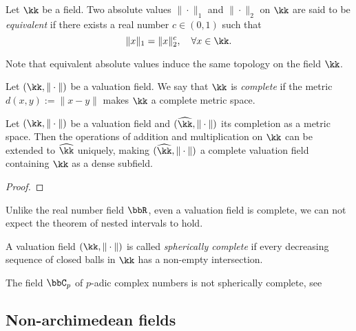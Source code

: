    \begin{definition}\label{def:equivalent_of_absolute_values}
        Let \(\kk\) be a field.
        Two absolute values \(\|\cdot\|_1\) and \(\|\cdot\|_2\) on \(\kk\) are said to be \emph{equivalent} if there exists a real number \(c \in (0,1)\) such that
        \[ \|x\|_1 = \|x\|_2^c, \quad \forall x \in \kk. \]
    \end{definition}

    Note that equivalent absolute values induce the same topology on the field \(\kk\).

    \begin{definition}\label{def:complete_valuation_field}
        Let \((\kk,\|\cdot\|)\) be a valuation field.
        We say that \(\kk\) is \emph{complete} if the metric \(d(x,y) := \|x - y\|\) makes \(\kk\) a complete metric space.
    \end{definition}

    \begin{lemma}\label{lem:completion_of_valuation_field}
        Let \((\kk,\|\cdot\|)\) be a valuation field and \((\widehat{\kk},\|\cdot\|)\) its completion as a metric space.
        Then the operations of addition and multiplication on \(\kk\) can be extended to \(\widehat{\kk}\) uniquely, making \((\widehat{\kk},\|\cdot\|)\) a complete valuation field containing \(\kk\) as a dense subfield.
    \end{lemma}
    \begin{proof}
    \end{proof}

    Unlike the real number field \(\bbR\), even a valuation field is complete, we can not expect the theorem of nested intervals to hold.

    \begin{definition}\label{def:spherically_complete}
        A valuation field \((\kk,\|\cdot\|)\) is called \emph{spherically complete} if every decreasing sequence of closed balls in \(\kk\) has a non-empty intersection.
    \end{definition}

    \begin{example}\label{eg:p-adic_complex_field_is_not_spherically_complete}
        The field \(\bbC_p\) of \(p\)-adic complex numbers is not spherically complete, see 
    \end{example}

\subsection{Non-archimedean fields}

